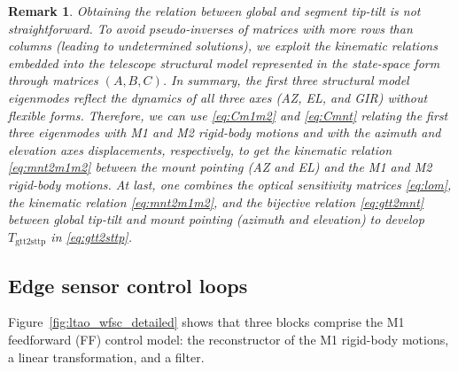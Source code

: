 \documentclass{gmto}
\newtheorem{remark}{Remark}
\begin{document}
\begin{remark}
    Obtaining the relation between global and segment tip-tilt is not straightforward. To avoid pseudo-inverses of matrices with more rows than columns (leading to undetermined solutions), we exploit the kinematic relations embedded into the telescope structural model represented in the state-space form through matrices $\left(A,B,C\right)$. In summary, the first three structural model eigenmodes reflect the dynamics of all three axes (AZ, EL, and GIR) without flexible forms. Therefore, we can use \eqref{eq:Cm1m2} and \eqref{eq:Cmnt} relating the first three eigenmodes with M1 and M2 rigid-body motions and with the azimuth and elevation axes displacements, respectively, to get the kinematic relation \eqref{eq:mnt2m1m2} between the mount pointing (AZ and EL) and the M1 and M2 rigid-body motions. At last, one combines the optical sensitivity matrices \eqref{eq:lom}, the kinematic relation \eqref{eq:mnt2m1m2}, and the bijective relation \eqref{eq:gtt2mnt} between global tip-tilt and mount pointing (azimuth and elevation) to develop $T_\text{gtt2sttp}$ in \eqref{eq:gtt2sttp}.
\end{remark}



\subsection{Edge sensor control loops}

Figure~\ref{fig:ltao_wfsc_detailed} shows that three blocks comprise the M1 feedforward (FF) control model: the reconstructor of the M1 rigid-body motions, a linear transformation, and a filter.
\end{document}
